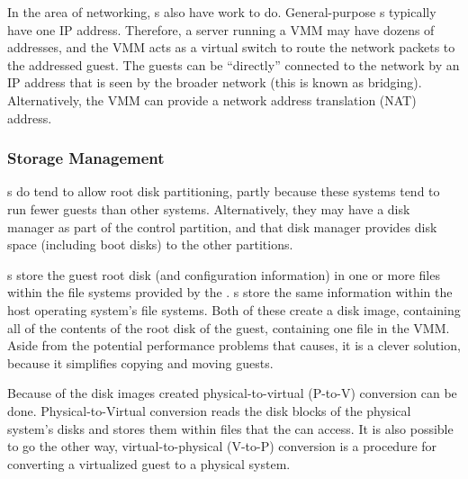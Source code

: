 In the area of networking, s also have work to do.
General-purpose s typically have one IP address.
Therefore, a server running a VMM may have dozens of addresses, and the VMM acts as a virtual switch to route the network packets to the addressed guest.
The guests can be ``directly'' connected to the network by an IP address that is seen by the broader network (this is known as bridging).
Alternatively, the VMM can provide a network address translation (NAT) address.

\subsubsection{Storage Management}\label{subsubsec:VM_Storage_Management}
s do tend to allow root disk partitioning, partly because these systems tend to run fewer guests than other systems.
Alternatively, they may have a disk manager as part of the control partition, and that disk manager provides disk space (including boot disks) to the other partitions.

s store the guest root disk (and configuration information) in one or more files within the file systems provided by the .
s store the same information within the host operating system's file systems.
Both of these create a disk image, containing all of the contents of the root disk of the guest, containing one file in the VMM.\@
Aside from the potential performance problems that causes, it is a clever solution, because it simplifies copying and moving guests.

Because of the disk images created physical-to-virtual (P-to-V) conversion can be done.
Physical-to-Virtual conversion reads the disk blocks of the physical system's disks and stores them within files that the  can access.
It is also possible to go the other way, virtual-to-physical (V-to-P) conversion is a procedure for converting a virtualized guest to a physical system.


